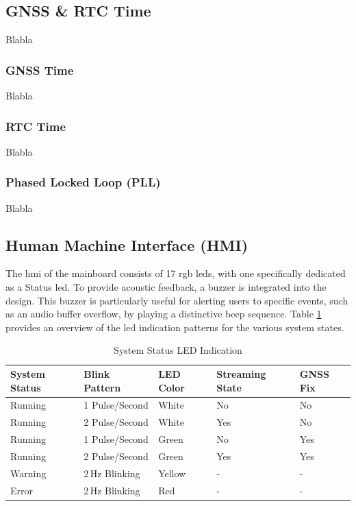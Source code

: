 \newpage
\subsection{GNSS \& RTC Time}
Blabla

\subsubsection{GNSS Time}
Blabla

\subsubsection{RTC Time}
Blabla

\subsubsection{Phased Locked Loop (PLL)}
Blabla

\subsection{Human Machine Interface (HMI)}
The \acrfull{hmi} of the mainboard consists of 17 \acrshort{rgb} \acrshort{led}s, with one specifically dedicated as a Status \acrshort{led}.
To provide acoustic feedback, a buzzer is integrated into the design.
This buzzer is particularly useful for alerting users to specific events, such as an audio buffer overflow, by playing a distinctive beep sequence.
Table \ref{tab:system_status_led} provides an overview of the \acrshort{led} indication patterns for the various system states.
\begin{table}[h!]
	\centering
	\begin{tabular}{ l l l l l}
		\textbf{System Status} & \textbf{Blink Pattern} & \textbf{LED Color} & \textbf{Streaming State} & \textbf{GNSS Fix} \vspace{0.1cm} \\ \hline
		Running                & 1 Pulse/Second         & White              & No                       & No                               \\ \hline
		Running                & 2 Pulse/Second         & White              & Yes                      & No                               \\ \hline
		Running                & 1 Pulse/Second         & Green              & No                       & Yes                              \\ \hline
		Running                & 2 Pulse/Second         & Green              & Yes                      & Yes                              \\ \hline
		Warning                & 2\,Hz Blinking         & Yellow             & -                        & -                                \\ \hline
		Error                  & 2\,Hz Blinking         & Red                & -                        & -                                \\ \hline
	\end{tabular}
	\caption{System Status LED Indication}
	\label{tab:system_status_led}
\end{table}

